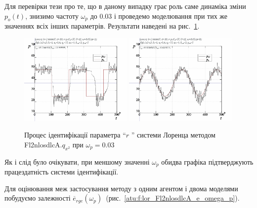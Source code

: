 Для перевірки тези про те, що в даному випадку грає роль саме
динаміка зміни
$ p_o (t) $, знизимо частоту
$ \omega_p $ до
$ 0.03 $ і проведемо моделювання при тих же значеннях всіх інших
параметрів. Результати наведені на рис.~\ref{atu:f:lor_id_Fl2nlosdlcA_003}.

\begin{figure}[ht!]
  \centerline{
    \includegraphics[width=0.49\textwidth]{p/cha/lor/Fl2nlosdlcA/Fl2nlosdlcA-p_xz_1_wp003.png}
    \hfill
    \includegraphics[width=0.49\textwidth]{p/cha/lor/Fl2nlosdlcA/Fl2nlosdlcA-p_xz_0_wp003.png}
  }
\caption{Процес ідентифікації параметра ``$ r $ '' системи Лоренца методом Fl2nlosdlcA.$q_{x^2} $ при $ \omega_p = 0.03 $}
  \label{atu:f:lor_id_Fl2nlosdlcA_003}
\end{figure}

Як і слід було очікувати, при меншому значенні
$ \omega_p $ обидва графіка підтверджують працездатність системи
ідентифікації.

Для оцінювання меж застосування методу з одним агентом і двома
моделями побудуємо залежності
$\overline{e}_{rge}(\omega_p)$~(рис.~\ref{atu:f:lor_Fl2nlosdlcA_e_omega_p}).

